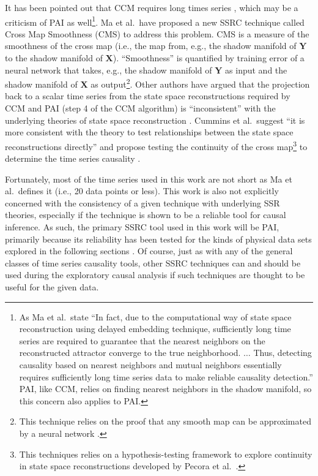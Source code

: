\documentclass{article}[10pt]
\begin{document}
It has been pointed out that CCM requires long times series \cite{Ma2014}, which may be a criticism of PAI as well\footnote{As Ma et al.\ state ``In fact, due to the computational way of state space reconstruction using delayed embedding technique, sufficiently long time series are required to guarantee that the nearest neighbors on the reconstructed attractor converge to the true neighborhood. $\ldots$  Thus, detecting causality based on nearest neighbors and mutual neighbors essentially requires sufficiently long time series data to make reliable causality detection.''  PAI, like CCM, relies on finding nearest neighbors in the shadow manifold, so this concern also applies to PAI.}.  Ma et al.\ have proposed a new SSRC technique called Cross Map Smoothness (CMS) to address this problem.  CMS is a measure of the smoothness of the cross map (i.e., the map from, e.g., the shadow manifold of $\mathbf{Y}$ to the shadow manifold of $\mathbf{X}$).  ``Smoothness'' is quantified by training error of a neural network that takes, e.g., the shadow manifold of $\mathbf{Y}$ as input and the shadow manifold of $\mathbf{X}$ as output\footnote{This technique relies on the proof that any smooth map can be approximated by a neural network \cite{Park1991}.}.  Other authors have argued that the projection back to a scalar time series from the state space reconstructions required by CCM and PAI (step 4 of the CCM algorithm) is ``inconsistent'' with the underlying theories of state space reconstruction \cite{Cummins2015}.  Cummins et al.\ suggest ``it is more consistent with the theory to test relationships between the state space reconstructions directly'' and propose testing the continuity of the cross map\footnote{This techniques relies on a hypothesis-testing framework to explore continuity in state space reconstructions developed by Pecora et al.\ \cite{Pecora1995}.} to determine the time series causality \cite{Cummins2015}.  

Fortunately, most of the time series used in this work are not short as Ma et al.\ defines it (i.e., 20 data points or less).  This work is also not explicitly concerned with the  consistency of a given technique with underlying SSR theories, especially if the technique is shown to be a reliable tool for causal inference.  As such, the primary SSRC tool used in this work will be PAI, primarily because its reliability has been tested for the kinds of physical data sets explored in the following sections \cite{Weigel2014}.  Of course, just as with any of the general classes of time series causality tools, other SSRC techniques can and should be used during the exploratory causal analysis if such techniques are thought to be useful for the given data.
\end{document}
